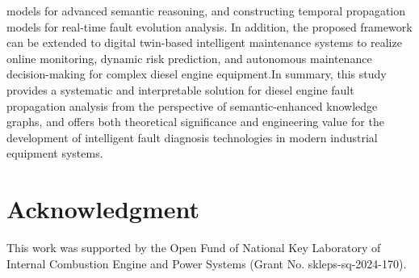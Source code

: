 \documentclass[conference]{IEEEconf}
\begin{document}
models for advanced semantic reasoning, and constructing temporal propagation models for real-time fault evolution analysis. In addition, the proposed framework can be extended to digital twin-based intelligent maintenance systems to realize online monitoring, dynamic risk prediction, and autonomous maintenance decision-making for complex diesel engine equipment.In summary, this study provides a systematic and interpretable solution for diesel engine fault propagation analysis from the perspective of semantic-enhanced knowledge graphs, and offers both theoretical significance and engineering value for the development of intelligent fault diagnosis technologies in modern industrial equipment systems.
\section*{Acknowledgment}
This work was supported by the Open Fund of National Key Laboratory of Internal Combustion Engine and Power Systems (Grant No. skleps-sq-2024-170).



\balance
\end{document}
